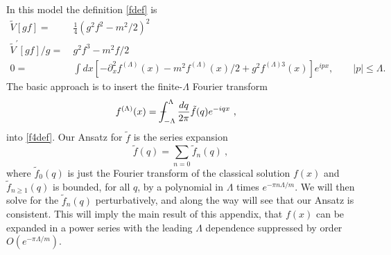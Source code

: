 \def\letter{0}\def\pr{0}\documentclass[a4paper,12pt, epsfig]{article}
\def\Xint#1{\mathchoice
   {\XXint\displaystyle\textstyle{#1}}%
   {\XXint\textstyle\scriptstyle{#1}}%
   {\XXint\scriptstyle\scriptscriptstyle{#1}}%
   {\XXint\scriptscriptstyle\scriptscriptstyle{#1}}%
   \!\int}
\def\XXint#1#2#3{{\setbox0=\hbox{$#1{#2#3}{\int}$}
     \vcenter{\hbox{$#2#3$}}\kern-.5\wd0}}
\def\dashint{\Xint-}
\def\blu#1{\textcolor{blue}{Jarah: #1}}
\renewcommand{\(}{\begin{equation}}
\renewcommand{\)}{end{equation} \vspace{-.05in}\linebreak}
\renewcommand{\=}{\hspace{-.03in}=\hspace{-.02in}}
\renewcommand{\(}{\begin{equation}}
\renewcommand{\)}{\end{equation}}
\newcommand{\p}{^\prime}
\renewcommand{\(}{\begin{equation}}
\renewcommand{\)}{\end{equation}}
\renewcommand{\L}{{(\Lambda)}}
\begin{document}
In this model the definition \eqref{fdef} is
%
\begin{align}
\tilde{V}[gf] =&~ \frac{1}{4}\left(g^2f^{2}-m^2/2\right)^2\nonumber\\
\tilde{V}\p[gf]/g =&~ g^2f^3-m^2f/2\nonumber\\
0 =&~ \int dx \left[-\partial^2_xf^{\L}(x)-m^2 f^\L(x)/2+g^2f^{\L 3}(x)\right]e^{ipx}, \qquad  |p|\leq \Lambda. \label{f4def}
\end{align}
%
The basic approach is to insert the finite-$\Lambda$ Fourier transform
%
\begin{align}\label{fLdashint}
f^\L(x) =&~ \dashint_{-\Lambda}^{\Lambda} \frac{dq}{2\pi} \tilde{f}(q) e^{- i q x}~, 
\end{align}
%
into \eqref{f4def}.  Our Ansatz for $\tilde{f}$ is the series expansion
%
\begin{equation}\label{ftildepert}
\tilde{f}(q) = \sum_{n = 0} \tilde{f}_n(q)~,
\end{equation}
%
where $\tilde{f}_0(q)$ is just the Fourier transform of the classical solution $f(x)$ and $\tilde{f}_{n\geq 1}(q)$ is bounded, for all $q$, by a polynomial in $\Lambda$ times $e^{-\pi n \Lambda/m}$.  We will then solve for the $\tilde{f}_n(q)$ perturbatively, and along the way will see that our Ansatz is consistent.  This will imply the main result of this appendix, that $f(x)$ can be expanded in a power series with the leading $\Lambda$ dependence suppressed by order $O(e^{-\pi \Lambda/m})$.%
\end{document}
